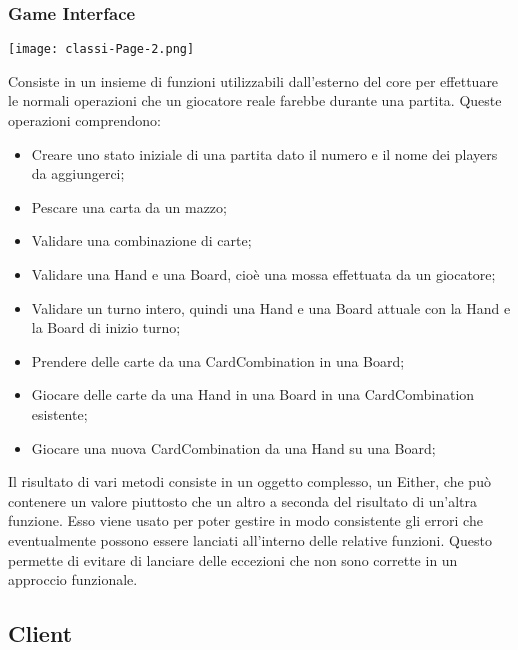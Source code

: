 \subsubsection{Game Interface}
\begin{center}
    \texttt{[image: classi-Page-2.png]} %
\end{center}
Consiste in un insieme di funzioni utilizzabili dall’esterno del core per effettuare le normali operazioni che un giocatore reale farebbe durante una partita.
Queste operazioni comprendono:
\begin{itemize}
    \item Creare uno stato iniziale di una partita dato il numero e il nome dei players da aggiungerci;
    \item Pescare una carta da un mazzo;
    \item Validare una combinazione di carte;
    \item Validare una Hand e una Board, cioè una mossa effettuata da un giocatore;
    \item Validare un turno intero, quindi una Hand e una Board attuale con la Hand e la Board di inizio turno;
    \item Prendere delle carte da una CardCombination in una Board;
    \item Giocare delle carte da una Hand in una Board in una CardCombination esistente;
    \item Giocare una nuova CardCombination da una Hand su una Board;
\end{itemize}
Il risultato di vari metodi consiste in un oggetto complesso, un Either, che può contenere un valore piuttosto che un altro a seconda del risultato di un’altra funzione.
Esso viene usato per poter gestire in modo consistente gli errori che eventualmente possono essere lanciati all’interno delle relative funzioni.
Questo permette di evitare di lanciare delle eccezioni che non sono corrette in un approccio funzionale.

\subsection{Client}

